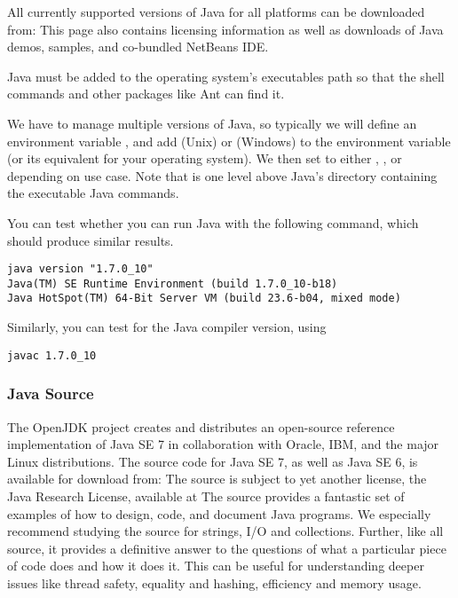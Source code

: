 All currently supported versions of Java for all platforms can be downloaded from:
%
%
This page also contains licensing information as well as downloads of
Java demos, samples, and co-bundled NetBeans IDE.

Java must be added to the operating system's executables path so
that the shell commands and other packages like Ant can find it.

We have to manage multiple versions of Java, so typically we will
define an environment variable , and add
 (Unix) or
 (Windows) to the
 environment variable (or its equivalent for your
operating system).  We then set  to either
, , or 
depending on use case.  Note that  is one level
above Java's  directory containing the executable Java
commands.

You can test whether you can run Java with the following command, which
should produce similar results.
%
\begin{verbatim}
java version "1.7.0_10"
Java(TM) SE Runtime Environment (build 1.7.0_10-b18)
Java HotSpot(TM) 64-Bit Server VM (build 23.6-b04, mixed mode)
\end{verbatim}
%
Similarly, you can test for the Java compiler version, using
%
\begin{verbatim}
javac 1.7.0_10
\end{verbatim}


\subsubsection{Java Source}

The OpenJDK project creates and distributes an open-source reference
implementation of Java SE 7 in collaboration with Oracle, IBM, and
the major Linux distributions.  The source code for Java SE 7,
as well as Java SE 6,  is available for download from:
%
%
The source is subject to yet another license, the Java Research License,
available at
%
%
The source provides a fantastic set of examples of how to design,
code, and document Java programs.  We especially recommend studying
the source for strings, I/O and collections.  Further, like all
source, it provides a definitive answer to the questions of what a
particular piece of code does and how it does it.  This can be useful
for understanding deeper issues like thread safety, equality and
hashing, efficiency and memory usage.


